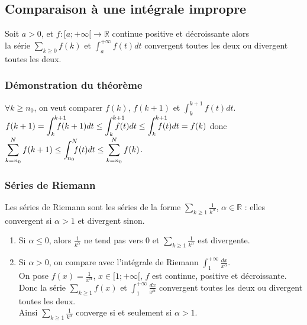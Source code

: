 \documentclass[a4paper,10pt]{book} %
\newcommand{\R}{\mathbb{R}}
\newcommand{\displayAmath}{\displaystyle}
\begin{document}
\subsection{Comparaison à une intégrale impropre}
Soit $a>0$, et $\displayAmath f:[a;+\infty[\rightarrow \R$ continue positive et décroissante alors\\la série $\displayAmath \sum_{k\geq 0}f(k)$ et $\displayAmath \int_a^{+\infty}f(t)dt$ convergent toutes les deux ou divergent toutes les deux.

\subsubsection{Démonstration du théorème}
$\forall k\geq n_0$, on veut comparer $f(k)$, $f(k+1)$ et $\int_k^{k+1}f(t)dt$.\\
$\displayAmath f(k+1)=\int_k^{\mathclap{~~~~k+1}}f(k+1)dt\leq \int_k^{\mathclap{~~~~k+1}}f(t)dt\leq \int_{k}^{\mathclap{~~~~k+1}}f(t)dt=f(k)$ donc $\displayAmath\sum_{k=n_0}^Nf(k+1)\leq \int_{\mathclap{~~n_0}}^{\mathclap{~~N}}f(t)dt\leq \sum_{k=n_0}^{N}f(k)$.

\subsubsection{Séries de Riemann}
Les séries de Riemann sont les séries de la forme $\sum_{k\geq 1}\frac{1}{k^\alpha}$, $\alpha\in\R$ : elles convergent si $\alpha>1$ et divergent sinon.

\begin{enumerate}
\item Si $\alpha\leq 0$, alors $\frac{1}{k^\alpha}$ ne tend pas vers 0 et $\displayAmath\sum_{k\geq 1}\frac{1}{k^\alpha}$ est divergente.

\item Si $\alpha>0$, on compare avec l'intégrale de Riemann $\displayAmath \int_1^{+\infty}\frac{dx}{x^\alpha}$.\\
On pose $\displayAmath f(x)=\frac{1}{x^\alpha}$, $x\in[1;+\infty[$,
$f$ est continue, positive et décroissante.\\
Donc la série $\displayAmath\sum_{k\geq 1}f(x)$ et $\displayAmath\int_1^{+\infty} \frac{dx}{x^\alpha}$ convergent toutes les deux ou divergent toutes les deux.\\

Ainsi $\sum_{k\geq 1} \frac{1}{k^\alpha}$ converge si et seulement si $\alpha>1$.
\end{enumerate}
\end{document}
